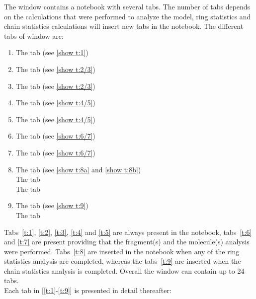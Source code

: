 The  window contains a notebook with several tabs. 
The number of tabs depends on the calculations that were performed to analyze the model, 
ring statistics and chain statistics calculations will insert new tabs in the notebook. 
The different tabs of  window are:
\begin{enumerate}
\item\label{t:1} The  tab  (see \ref{show t:1})
\item\label{t:2} The  tab (see \ref{show t:2/3})
\item\label{t:3} The  tab (see \ref{show t:2/3})
\item\label{t:4} The  tab (see \ref{show t:4/5})
\item\label{t:5} The  tab (see \ref{show t:4/5})
\item\label{t:6} The  tab (see \ref{show t:6/7})
\item\label{t:7} The  tab (see \ref{show t:6/7})
\item\label{t:8} The  tab (see \ref{show t:8a} and \ref{show t:8b})\\
\qquad The  tab \\
\qquad The  tab
\item\label{t:9} The  tab (see \ref{show t:9})\\
\qquad The  tab
\end{enumerate}
Tabs~\ref{t:1}, \ref{t:2}, \ref{t:3}, \ref{t:4} and \ref{t:5} are always present in the notebook, 
tabs~\ref{t:6} and \ref{t:7} are present providing that the fragment(s) and the molecule(s) analysis were performed.  
Tabs~\ref{t:8} are inserted in the notebook when any of the ring statistics analysis are completed, whereas the tabs~\ref{t:9} are inserted when the chain statistics analysis is completed. 
Overall the  window can contain up to 24 tabs.\\
Each tab in [\ref{t:1}-\ref{t:9}] is presented in detail thereafter: 
\clearpage
\newcommand{\cosize}{8.0}
